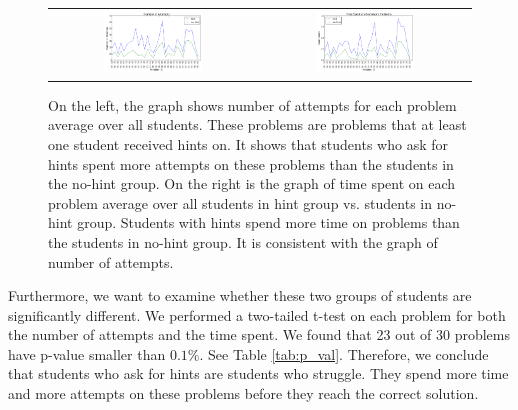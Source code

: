 \documentclass{article} %
\begin{document}
\begin{figure}[ht]
\centering
   \begin{tabular}{c c}
		\includegraphics[width=0.5\textwidth]{image/tries_analysis.png} &
		\includegraphics[width=0.5\textwidth]{image/times_analysis.png}
	\end{tabular}
    \caption{On the left, the graph shows number of attempts for each problem average over all students. These problems are problems that at least one student received hints on. It shows that students who ask for hints spent more attempts on these problems than the students in the no-hint group. On the right is the graph of time spent on each problem average over all students in hint group vs. students in no-hint group. Students with hints spend more time on problems than the students in no-hint group. It is consistent with the graph of number of attempts.}
    \label{fig:tries_times_analysis}
\end{figure}

Furthermore, we want to examine whether these two groups of students are significantly different. We performed a two-tailed t-test on each problem for both the number of attempts and the time spent. We found that 23 out of 30 problems have p-value smaller than $0.1\%$. See Table \ref{tab:p_val}. Therefore, we conclude that students who ask for hints are students who struggle. They spend more time and more attempts on these problems before they reach the correct solution.
\end{document}
